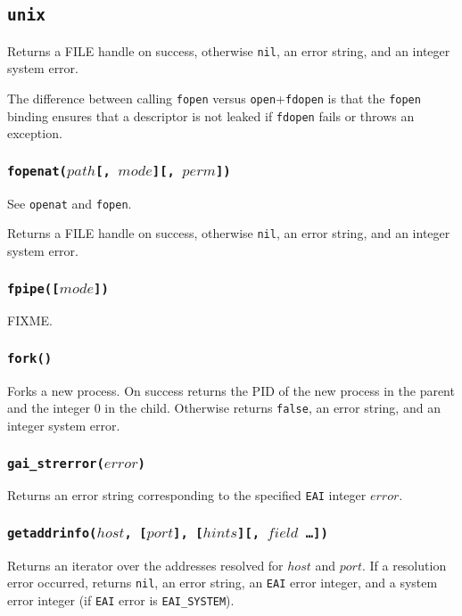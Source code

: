 \documentclass[11pt, oneside]{memoir}
\newcommand*{\false}[0]{\texttt{false}\xspace}
\newcommand*{\nil}[0]{\texttt{nil}\xspace}
\newcommand*{\syscall}[1]{\texttt{#1}\xspace}
\newcommand*{\fn}[1]{\texttt{#1}\xspace}
\newcounter{toccols}
\newenvironment{Module}[1]{
	\subsection{\texttt{#1}}
	\addtocontents{toc}{
		\protect\begin{multicols}{\value{toccols}}
	}
}{
	\addtocontents{toc}{\protect\end{multicols}}
}
\begin{document}
\begin{Module}{unix}
Returns a FILE handle on success, otherwise \nil, an error string, and an integer system error.

The difference between calling \syscall{fopen} versus \syscall{open}+\syscall{fdopen} is that the \syscall{fopen} binding ensures that a descriptor is not leaked if \syscall{fdopen} fails or throws an exception.

\subsubsection[\fn{fopenat}]{\fn{fopenat($path$[, $mode$][, $perm$])}}

See \syscall{openat} and \syscall{fopen}.

Returns a FILE handle on success, otherwise \nil, an error string, and an integer system error.

\subsubsection[\fn{fpipe}]{\fn{fpipe([$mode$])}}

FIXME.

\subsubsection[\fn{fork}]{\fn{fork()}}

Forks a new process. On success returns the PID of the new process in the parent and the integer 0 in the child. Otherwise returns \false, an error string, and an integer system error.

\subsubsection[\fn{gai\_strerror}]{\fn{gai\_strerror($error$)}}

Returns an error string corresponding to the specified \texttt{EAI} integer $error$.

\subsubsection[\fn{getaddrinfo}]{\fn{getaddrinfo($host$, [$port$], [$hints$][, $field$ \ldots])}}

Returns an iterator over the addresses resolved for $host$ and $port$. If a resolution error occurred, returns \nil, an error string, an \texttt{EAI} error integer, and a system error integer (if \texttt{EAI} error is \texttt{EAI\_SYSTEM}).


\end{Module}
\end{document}
